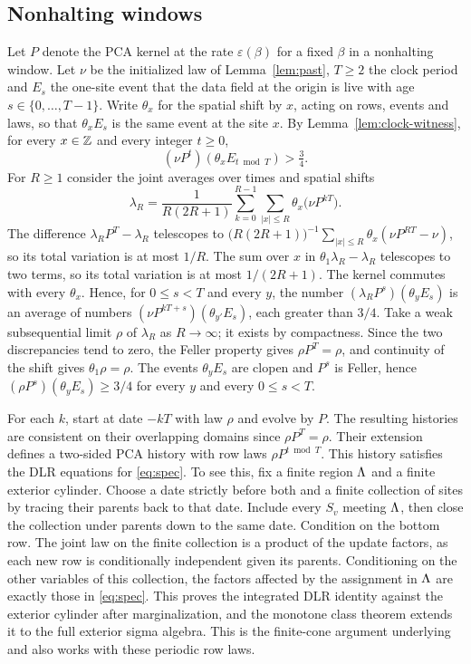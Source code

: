\subsection{Nonhalting windows}\label{sec:gibbs-nonhalting}

Let \(P\) denote the PCA kernel at the rate \(\varepsilon(\beta)\) for a fixed \(\beta\) in a nonhalting window. Let \(\nu\) be the initialized law of Lemma~\ref{lem:past}, \(T\ge2\) the clock period and \(E_s\) the one-site event that the data field at the origin is live with age \(s\in\{0,\ldots,T-1\}\). Write \(\theta_x\) for the spatial shift by \(x\), acting on rows, events and laws, so that \(\theta_xE_s\) is the same event at the site \(x\). By Lemma~\ref{lem:clock-witness}, for every \(x\in\mathbb Z\) and every integer \(t\ge0\),
\[
(\nu P^{t})(\theta_xE_{t\bmod T})>\tfrac34.
\]
For \(R\ge1\) consider the joint averages over times and spatial shifts
\[
\lambda_R=\frac{1}{R(2R+1)}\sum_{k=0}^{R-1}\sum_{|x|\le R}\theta_x\bigl(\nu P^{kT}\bigr).
\]
The difference \(\lambda_RP^T-\lambda_R\) telescopes to \(\bigl(R(2R+1)\bigr)^{-1}\sum_{|x|\le R}\theta_x(\nu P^{RT}-\nu)\), so its total variation is at most \(1/R\). The sum over \(x\) in \(\theta_1\lambda_R-\lambda_R\) telescopes to two terms, so its total variation is at most \(1/(2R+1)\). The kernel commutes with every \(\theta_x\). Hence, for \(0\le s<T\) and every \(y\), the number \((\lambda_RP^s)(\theta_yE_s)\) is an average of numbers \((\nu P^{kT+s})(\theta_{y'}E_s)\), each greater than \(3/4\). Take a weak subsequential limit \(\rho\) of \(\lambda_R\) as \(R\to\infty\); it exists by compactness. Since the two discrepancies tend to zero, the Feller property gives \(\rho P^T=\rho\), and continuity of the shift gives \(\theta_1\rho=\rho\). The events \(\theta_yE_s\) are clopen and \(P^s\) is Feller, hence \((\rho P^s)(\theta_yE_s)\ge3/4\) for every \(y\) and every \(0\le s<T\).

For each \(k\), start at date \(-kT\) with law \(\rho\) and evolve by \(P\). The resulting histories are consistent on their overlapping domains since \(\rho P^T=\rho\). Their extension defines a two-sided PCA history with row laws \(\rho P^{t\bmod T}\). This history satisfies the DLR equations for \eqref{eq:spec}. To see this, fix a finite region \(\Lambda\) and a finite exterior cylinder. Choose a date strictly before both and a finite collection of sites by tracing their parents back to that date. Include every \(S_v\) meeting \(\Lambda\), then close the collection under parents down to the same date. Condition on the bottom row. The joint law on the finite collection is a product of the update factors, as each new row is conditionally independent given its parents. Conditioning on the other variables of this collection, the factors affected by the assignment in \(\Lambda\) are exactly those in \eqref{eq:spec}. This proves the integrated DLR identity against the exterior cylinder after marginalization, and the monotone class theorem extends it to the full exterior sigma algebra. This is the finite-cone argument underlying \cite[Lemma~2.4]{dmSpaceTime} and also works with these periodic row laws.

